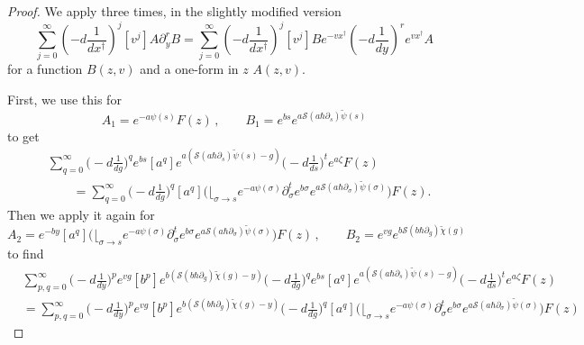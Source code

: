 \documentclass[10pt,a4paper,oneside,no-math,reqno]{amsart}%
\theoremstyle{plain}
\theoremstyle{definition}
\theoremstyle{remark}
\numberwithin{equation}{section}
\newcommand{\mc}[1]{\mathcal{#1}}
\newcommand{\1}{\mathds{1}}
\newcommand{\<}{\langle}
\renewcommand{\>}{\rangle}
\newcommand{\del}{\partial}
\begin{document}
\begin{proof}

	We apply \cite[(73)]{ABDKS24} three times, in the slightly modified version
	\begin{equation}\label{FormalIntByParts}
		\sum_{j=0}^\infty ( - d \frac{1}{dx^\dagger} )^j [v^j] A \del_y^r B
		=
		\sum_{j=0}^\infty ( - d \frac{1}{dx^\dagger} )^j [v^j] B e^{- v x^\dagger} (- d \frac{1}{dy} )^r e^{v x^\dagger} A
	\end{equation}
	for a function $ B(z,v)$ and a one-form in $z$ $A(z,v)$.
	
	First, we use this for
	\begin{equation}
		A_1 
		= 
		e^{-a \psi (s )} F(z) \,, 
		\qquad 
		B_1
		=
		e^{b s} e^{a \mc{S} (a \hbar \del_s )\tilde{\psi} (s)}
	\end{equation}
	to get
	\begin{equation*}
		\begin{split}
			&
			\sum_{q = 0}^\infty \big( -d \frac{1}{dg} \big)^q e^{bs} [a^q ]
			e^{a ( \mc{S}(a\hbar \del_s) \tilde{\psi}(s) - g )} \big( -d \frac{1}{ds} \big)^t e^{a \zeta} F(z)
			\\
			&\qquad=
			\sum_{q = 0}^\infty \big( -d \frac{1}{dg} \big)^q [a^q ] \bigg(  \Big\lfloor_{\sigma \to s} e^{-a \psi (\sigma)} \del_\sigma^t e^{b \sigma} e^{a \mc{S}(a \hbar \del_\sigma)\tilde{\psi} (\sigma) } \bigg) F(z) .
		\end{split}
	\end{equation*}
	Then we apply it again for
	\begin{equation}
		A_2
		=
		e^{-b y} [a^q ] \bigg(  \Big\lfloor_{\sigma \to s} e^{-a \psi (\sigma)} \del_\sigma^t e^{b \sigma} e^{a \mc{S}(a \hbar \del_\sigma)\tilde{\psi} (\sigma) } \bigg) F(z) \,,
		\qquad
		B_2
		=
		e^{vg} e^{b \mc{S}(b \hbar \del_g) \tilde{\chi} (g)}
	\end{equation}
	to find
	\begin{equation*}
		\begin{split}
			&\sum_{p,q = 0}^\infty \big( -d \frac{1}{dy} \big)^p e^{vg} [b^p ]
			e^{b ( \mc{S}(b\hbar \del_g) \tilde{\chi}(g) - y )} \big( -d \frac{1}{dg} \big)^q e^{bs} [a^q ]
			e^{a ( \mc{S}(a\hbar \del_s) \tilde{\psi}(s) - g )} \big( -d \frac{1}{ds} \big)^t e^{a\zeta} F(z)
			\\
			&=
			\sum_{p,q = 0}^\infty \big( -d \frac{1}{dy} \big)^p e^{vg} [b^p ]
			e^{b ( \mc{S}(b\hbar \del_g) \tilde{\chi}(g) - y )} \big( -d \frac{1}{dg} \big)^q [a^q ]
			\bigg(  \Big\lfloor_{\sigma \to s} e^{-a \psi (\sigma)} \del_{\sigma}^t e^{b \sigma} e^{a \mc{S}(a \hbar \del_{\sigma})\tilde{\psi} (\sigma) } \bigg) F(z) 

\end{split}
\end{equation*}
\end{proof}
\end{document}
